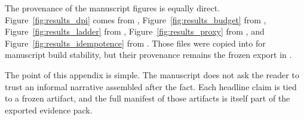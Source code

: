 The provenance of the manuscript figures is equally direct. Figure~\ref{fig:results_dpi} comes from , Figure~\ref{fig:results_budget} from , Figure~\ref{fig:results_ladder} from , Figure~\ref{fig:results_proxy} from , and Figure~\ref{fig:results_idempotence} from . Those files were copied into  for manuscript build stability, but their provenance remains the frozen export in .

The point of this appendix is simple. The manuscript does not ask the reader to trust an informal narrative assembled after the fact. Each headline claim is tied to a frozen artifact, and the full manifest of those artifacts is itself part of the exported evidence pack.
